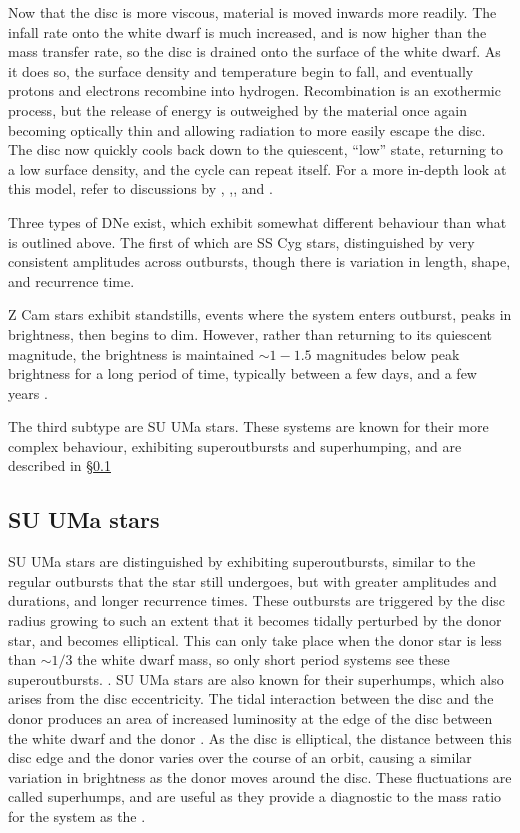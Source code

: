 Now that the disc is more viscous, material is moved inwards more readily. The infall rate onto the white dwarf is much increased, and is now higher than the mass transfer rate, so the disc is drained onto the surface of the white dwarf. As it does so, the surface density and temperature begin to fall, and eventually protons and electrons recombine into hydrogen. Recombination is an exothermic process, but the release of energy is outweighed by the material once again becoming optically thin and allowing radiation to more easily escape the disc. The disc now quickly cools back down to the quiescent, ``low'' state, returning to a low surface density, and the cycle can repeat itself. For a more in-depth look at this model, refer to discussions by \citet{cannizzo1993}, \citet{osaki1996},, and \citet{Hameury2002}.

Three types of DNe exist, which exhibit somewhat different behaviour than what is outlined above. The first of which are SS Cyg stars, distinguished by very consistent amplitudes across outbursts, though there is variation in length, shape, and recurrence time.

Z Cam stars exhibit standstills, events where the system enters outburst, peaks in brightness, then begins to dim. However, rather than returning to its quiescent magnitude, the brightness is maintained $\sim 1-1.5$ magnitudes below peak brightness for a long period of time, typically between a few days, and a few years \citep{simonsen2014}.

The third subtype are SU UMa stars. These systems are known for their more complex behaviour, exhibiting superoutbursts and superhumping, and are described in \S\ref{sect:introduction:SU UMa}

\subsection{SU UMa stars}
\label{sect:introduction:SU UMa}

SU UMa stars are distinguished by exhibiting superoutbursts, similar to the regular outbursts that the star still undergoes, but with greater amplitudes and durations, and longer recurrence times. These outbursts are triggered by the disc radius growing to such an extent that it becomes tidally perturbed by the donor star, and becomes elliptical. This can only take place when the donor star is less than $\sim 1/3$ the white dwarf mass, so only short period systems see these superoutbursts. \citep{hellier2001}. 
SU UMa stars are also known for their superhumps, which also arises from the disc eccentricity. The tidal interaction between the disc and the donor produces an area of increased luminosity at the edge of the disc between the white dwarf and the donor \citep{warner1988}. As the disc is elliptical, the distance between this disc edge and the donor varies over the course of an orbit, causing a similar variation in brightness as the donor moves around the disc.
These fluctuations are called superhumps, and are useful as they provide a diagnostic to the mass ratio for the system as the  \citep{Patterson1998, Patterson2001, patterson2005}. 

